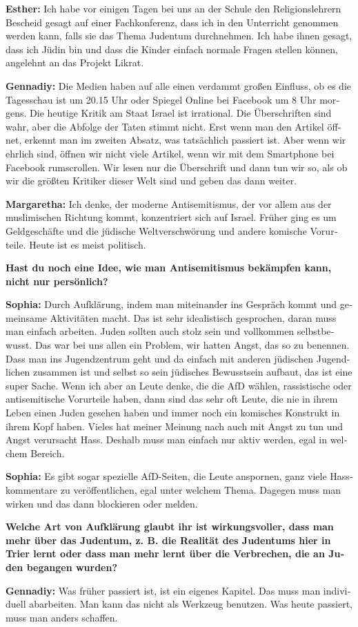 \begin{otherlanguage}{ngerman}
\textbf{Esther:} Ich habe vor einigen Tagen bei uns an der Schule den Religionslehrern Bescheid gesagt auf einer Fachkonferenz, dass ich in den Unterricht genommen werden kann, falls sie das Thema Judentum durchnehmen. Ich habe ihnen gesagt, dass ich Jüdin bin und dass die Kinder einfach normale Fragen stellen können, angelehnt an das Projekt Likrat. 

\textbf{Gennadiy:} Die Medien haben auf alle einen verdammt großen Einfluss, ob es die Tagesschau ist um 20.15 Uhr oder Spiegel Online bei Facebook um 8 Uhr morgens. Die heutige Kritik am Staat Israel ist irrational. Die Überschriften sind wahr, aber die Abfolge der Taten stimmt nicht. Erst wenn man den Artikel öffnet, erkennt man im zweiten Absatz, was tatsächlich passiert ist. Aber wenn wir ehrlich sind, öffnen wir nicht viele Artikel, wenn wir mit dem Smartphone bei Facebook rumscrollen. Wir lesen nur die Überschrift und dann tun wir so, als ob wir die größten Kritiker dieser Welt sind und geben das dann weiter.  

\textbf{Margaretha:} Ich denke, der moderne Antisemitismus, der vor allem aus der muslimischen Richtung kommt, konzentriert sich auf Israel. Früher ging es um Geldgeschäfte und die jüdische Weltverschwörung und andere komische Vorurteile. Heute ist es meist politisch. 

\textbf{Hast du noch eine Idee, wie man Antisemitismus bekämpfen kann, nicht nur persönlich?} 

\textbf{Sophia:} Durch Aufklärung, indem man miteinander ins Gespräch kommt und gemeinsame Aktivitäten macht. Das ist sehr idealistisch gesprochen, daran muss man einfach arbeiten. Juden sollten auch stolz sein und vollkommen selbstbewusst. Das war bei uns allen ein Problem, wir hatten Angst, das so zu benennen. Dass man ins Jugendzentrum geht und da einfach mit anderen jüdischen Jugendlichen zusammen ist und selbst so sein jüdisches Bewusstsein aufbaut, das ist eine super Sache. Wenn ich aber an Leute denke, die die AfD wählen, rassistische oder antisemitische Vorurteile haben, dann sind das sehr oft Leute, die nie in ihrem Leben einen Juden gesehen haben und immer noch ein komisches Konstrukt in ihrem Kopf haben. Vieles hat meiner Meinung nach auch mit Angst zu tun und Angst verursacht Hass. Deshalb muss man einfach nur aktiv werden, egal in welchem Bereich.     
                                    
\textbf{Sophia:} Es gibt sogar spezielle AfD-Seiten, die Leute anspornen, ganz viele Hasskommentare zu veröffentlichen, egal unter welchem Thema. Dagegen muss man wirken und das dann blockieren oder melden. 

\textbf{Welche Art von Aufklärung glaubt ihr ist wirkungsvoller, dass man mehr über das Judentum, z. B. die Realität des Judentums hier in Trier lernt oder dass man mehr lernt über die Verbrechen, die an Juden begangen  wurden?}\par                                                 \textbf{Gennadiy:} Was früher passiert ist, ist ein eigenes Kapitel. Das muss man individuell abarbeiten. Man kann das nicht als Werkzeug benutzen. Was heute passiert, muss man anders schaffen. 
\end{otherlanguage}